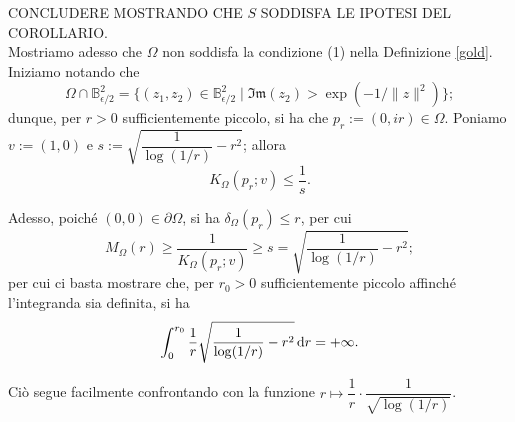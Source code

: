 CONCLUDERE MOSTRANDO CHE $S$ SODDISFA LE IPOTESI DEL COROLLARIO. \\

Mostriamo adesso che $\Omega$ non soddisfa la condizione (1) nella Definizione \ref{gold}. Iniziamo notando che
$$\Omega\cap\mathbb{B}^2_{\epsilon/2}=\{(z_1,z_2)\in\mathbb{B}^2_{\epsilon/2}\mid \mathfrak{Im}(z_2)>\exp(-1/\|z\|^2)\};$$
dunque, per $r>0$ sufficientemente piccolo, si ha che $p_r:=(0,ir)\in\Omega$. Poniamo $v:=(1,0)$ e $s:=\sqrt{\dfrac{1}{\log(1/r)}-r^2}$; allora 
$$K_\Omega(p_r;v) \le \frac{1}{s}.$$

Adesso, poiché $(0,0)\in\partial\Omega$, si ha $\delta_\Omega(p_r) \le r$, per cui
$$M_\Omega(r) \ge \frac{1}{K_\Omega(p_r;v)} \ge s=\sqrt{\frac{1}{\log(1/r)}-r^2};$$
per cui ci basta mostrare che, per $r_0>0$ sufficientemente piccolo affinché l'integranda sia definita, si ha
$$\int_0^{r_0}\frac{1}{r}\sqrt{\frac{1}{\log(1/r)}-r^2}\mathop{}\!\mathrm{d} r=+\infty.$$

Ciò segue facilmente confrontando con la funzione $r \longmapsto \dfrac{1}{r}\cdot\dfrac{1}{\sqrt{\log(1/r)}}$.